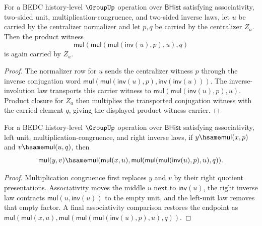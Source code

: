\begin{theorem}
\label{thm:subgroup-centralizer-right-quotient-product-witness-carrier}
For a BEDC history-level $\GroupUp$ operation over $\mathsf{BHist}$
satisfying associativity, two-sided unit, multiplication-congruence, and
two-sided inverse laws, let $u$ be carried by the centralizer normalizer and
let $p,q$ be carried by the centralizer $Z_a$. Then the product witness
$$
\mathsf{mul}(\mathsf{mul}(\mathsf{mul}(\mathsf{inv}(u),p),u),q)
$$
is again carried by $Z_a$.
\end{theorem}
\begin{proof}
The normalizer row for $u$ sends the centralizer witness $p$ through the
inverse conjugation word
$\mathsf{mul}(\mathsf{mul}(\mathsf{inv}(u),p),
\mathsf{inv}(\mathsf{inv}(u)))$. The inverse-involution law transports this
carrier witness to
$\mathsf{mul}(\mathsf{mul}(\mathsf{inv}(u),p),u)$. Product closure for
$Z_a$ then multiplies the transported conjugation witness with the carried
element $q$, giving the displayed product witness carrier.
\end{proof}

\begin{theorem}
\label{thm:subgroup-centralizer-right-quotient-product-witness-endpoint}
For a BEDC history-level $\GroupUp$ operation over $\mathsf{BHist}$
satisfying associativity, left unit, multiplication-congruence, and right
inverse laws, if
$y\hsame\mathsf{mul}(x,p)$ and $v\hsame\mathsf{mul}(u,q)$, then
$$
\mathsf{mul}(y,v)\hsame
\mathsf{mul}(\mathsf{mul}(x,u),
\mathsf{mul}(\mathsf{mul}(\mathsf{mul}(\mathsf{inv}(u),p),u),q)).
$$
\end{theorem}
\begin{proof}
Multiplication congruence first replaces $y$ and $v$ by their right quotient
presentations. Associativity moves the middle $u$ next to
$\mathsf{inv}(u)$, the right inverse law contracts
$\mathsf{mul}(u,\mathsf{inv}(u))$ to the empty unit, and the left-unit law
removes that empty factor. A final associativity comparison restores the
endpoint as
$\mathsf{mul}(\mathsf{mul}(x,u),
\mathsf{mul}(\mathsf{mul}(\mathsf{mul}(\mathsf{inv}(u),p),u),q))$.
\end{proof}

